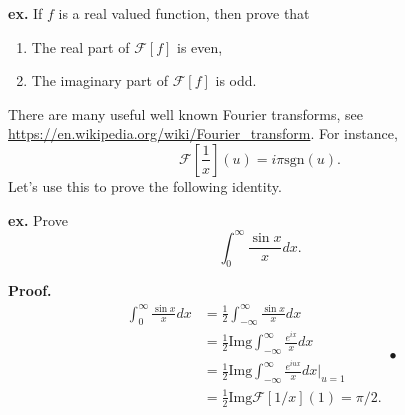 \documentclass{article}
\begin{document}
{\bf ex.} If $f$ is a real valued function, then prove that
\begin{enumerate}
\item
The real part of $\mathcal F[f]$ is even,
\item The imaginary part of $\mathcal F[f]$ is odd.
\end{enumerate}


There are many useful well known Fourier transforms, see \url{https://en.wikipedia.org/wiki/Fourier_transform}.
For instance, 
$$\mathcal F[\frac 1 x](u) = i \pi \text{sgn}(u).$$
Let's use this to prove the following identity. 

{\bf ex.}
Prove $$\int_0^\infty \frac{\sin x}{x} dx.$$

{\bf Proof.}
$$
\begin{array}
{ll}
\int_0^\infty \frac{\sin x}{x} dx & = \frac 1 2 \int_{-\infty}^\infty \frac{\sin x}{x} dx
\\ & = 
\frac 1 2 \text{Img} \int_{-\infty}^\infty \frac{e^{ix}}{x} dx
\\ & = 
\frac 1 2 \text{Img} \int_{-\infty}^\infty \frac{e^{i u x}}{x} dx \Big|_{u = 1}
\\ & = 
\frac 1 2 \text{Img} \mathcal F[1/x](1) = \pi/2.
\end{array}•
$$



%
%
%
%
\end{document}
